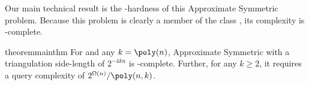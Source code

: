 Our main technical result is the \PPAD-hardness of this \outofk Approximate Symmetric \Sperner problem. 
Because this problem is clearly a member of the class \PPAD, its complexity is \PPAD-complete. 

\begin{restatable}[]{theorem}{mainthm}
    \label{thm:main}
    For and any $k=\poly(n)$, \outofk Approximate Symmetric \Sperner
    with a triangulation side-length of $2^{-4kn}$ 
    is \PPAD-complete.
    Further, for any $k\geq 2$, it requires a query complexity of $2^{\Omega(n)} / \poly(n,k)$.
\end{restatable}